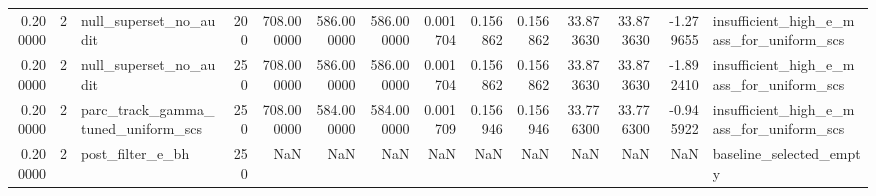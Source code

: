 \begin{tabular}{rrlrrrrrrrrrrl}
0.200000 & 2 & null_superset_no_audit & 200 & 708.000000 & 586.000000 & 586.000000 & 0.001704 & 0.156862 & 0.156862 & 33.873630 & 33.873630 & -1.279655 & insufficient_high_e_mass_for_uniform_scs \\
0.200000 & 2 & null_superset_no_audit & 250 & 708.000000 & 586.000000 & 586.000000 & 0.001704 & 0.156862 & 0.156862 & 33.873630 & 33.873630 & -1.892410 & insufficient_high_e_mass_for_uniform_scs \\
0.200000 & 2 & parc_track_gamma_tuned_uniform_scs & 250 & 708.000000 & 584.000000 & 584.000000 & 0.001709 & 0.156946 & 0.156946 & 33.776300 & 33.776300 & -0.945922 & insufficient_high_e_mass_for_uniform_scs \\
0.200000 & 2 & post_filter_e_bh & 250 & NaN & NaN & NaN & NaN & NaN & NaN & NaN & NaN & NaN & baseline_selected_empty \\
\bottomrule
\end{tabular}
